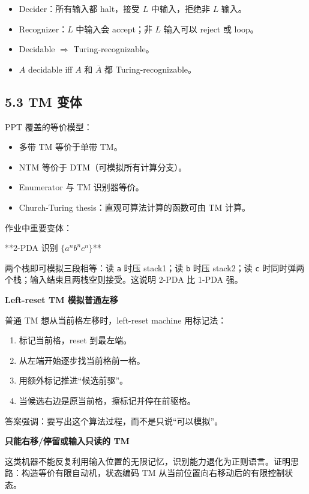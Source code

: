 ﻿\documentclass[UTF8,11pt]{ctexart}
\begin{document}
\begin{itemize}
\item Decider：所有输入都 halt，接受 \(L\) 中输入，拒绝非 \(L\) 输入。
\item Recognizer：\(L\) 中输入会 accept；非 \(L\) 输入可以 reject 或 loop。
\item Decidable \(\Rightarrow\) Turing-recognizable。
\item \(A\) decidable iff \(A\) 和 \(\overline A\) 都 Turing-recognizable。
\end{itemize}


\subsection{5.3 TM 变体}


PPT 覆盖的等价模型：


\begin{itemize}
\item 多带 TM 等价于单带 TM。
\item NTM 等价于 DTM（可模拟所有计算分支）。
\item Enumerator 与 TM 识别器等价。
\item Church-Turing thesis：直观可算法计算的函数可由 TM 计算。
\end{itemize}


作业中重要变体：


**2-PDA 识别 \(\{a^nb^nc^n\}\)**  

两个栈即可模拟三段相等：读 \texttt{a} 时压 stack1；读 \texttt{b} 时压 stack2；读 \texttt{c} 时同时弹两个栈；输入结束且两栈空则接受。这说明 2-PDA 比 1-PDA 强。


\textbf{Left-reset TM 模拟普通左移}  

普通 TM 想从当前格左移时，left-reset machine 用标记法：


\begin{enumerate}
\item 标记当前格，reset 到最左端。
\item 从左端开始逐步找当前格前一格。
\item 用额外标记推进“候选前驱”。
\item 当候选右边是原当前格，擦标记并停在前驱格。
\end{enumerate}


答案强调：要写出这个算法过程，而不是只说“可以模拟”。


\textbf{只能右移/停留或输入只读的 TM}  

这类机器不能反复利用输入位置的无限记忆，识别能力退化为正则语言。证明思路：构造等价有限自动机，状态编码 TM 从当前位置向右移动后的有限控制状态。
\end{document}

